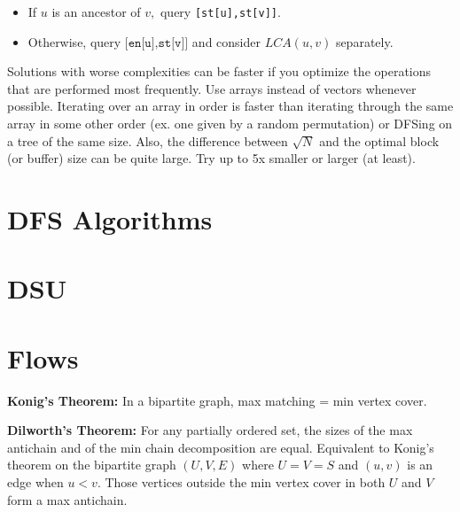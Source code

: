 		\begin{itemize}
		\item If $u$ is an ancestor of $v,$ query \texttt{[st[u],st[v]]}.
		\item Otherwise, query $\texttt{[en[u],st[v]]}$ and consider $LCA(u,v)$ separately.
		\end{itemize}

		Solutions with worse complexities can be faster if you optimize the operations that are performed most frequently. Use arrays instead of vectors whenever possible. Iterating over an array in order is faster than iterating through the same array in some other order (ex. one given by a random permutation) or DFSing on a tree of the same size. Also, the difference between $\sqrt N$ and the optimal block (or buffer) size can be quite large. Try up to 5x smaller or larger (at least).


\section{DFS Algorithms}


\section{DSU}

\section{Flows}

	\textbf{Konig's Theorem:} In a bipartite graph, max matching = min vertex cover.

	\textbf{Dilworth's Theorem:} For any partially ordered set, the sizes of the max antichain and of the min chain decomposition are equal. Equivalent to Konig's theorem on the bipartite graph $(U,V,E)$ where $U=V=S$ and $(u,v)$ is an edge when $u<v$. Those vertices outside the min vertex cover in both $U$ and $V$ form a max antichain.



